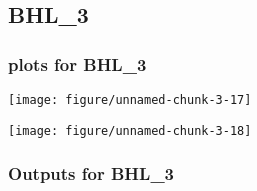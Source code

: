 \documentclass[10pt,a4paper]{article}\usepackage[]{graphicx}\usepackage[]{color}
\makeatletter
\def\maxwidth{ %
  \ifdim\Gin@nat@width>\linewidth
    \linewidth
  \else
    \Gin@nat@width
  \fi
}
\newcommand{\AaA}{\_}
\makeatother
\begin{document}
\newpage
\subsection{BHL\AaA 3}
\subsubsection{plots for BHL\AaA 3}

\texttt{[image: figure/unnamed-chunk-3-17]} 

\newpage

\texttt{[image: figure/unnamed-chunk-3-18]} 

\newpage
\subsubsection{Outputs for BHL\AaA 3}
\end{document}
